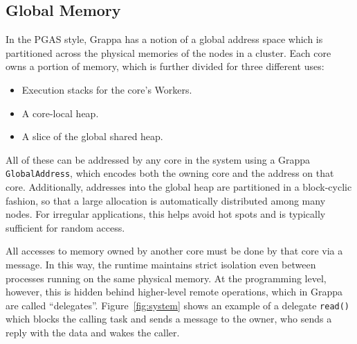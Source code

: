 \subsection{Global Memory}
In the PGAS style, Grappa has a notion of a global address space which is partitioned across the physical memories of the nodes in a cluster. Each core owns a portion of memory, which is further divided for three different uses:
\begin{itemize}
  \item Execution stacks for the core's Workers.
  \item A core-local heap.
  \item A slice of the global shared heap.
\end{itemize}
All of these can be addressed by any core in the system using a Grappa \texttt{GlobalAddress}, which encodes both the owning core and the address on that core. Additionally, addresses into the global heap are partitioned in a block-cyclic fashion, so that a large allocation is automatically distributed among many nodes. For irregular applications, this helps avoid hot spots and is typically sufficient for random access.

All accesses to memory owned by another core must be done by that core via a message. In this way, the runtime maintains strict isolation even between processes running on the same physical memory. At the programming level, however, this is hidden behind higher-level remote operations, which in Grappa are called ``delegates''. Figure~\ref{fig:system} shows an example of a delegate \texttt{read()} which blocks the calling task and sends a message to the owner, who sends a reply with the data and wakes the caller.